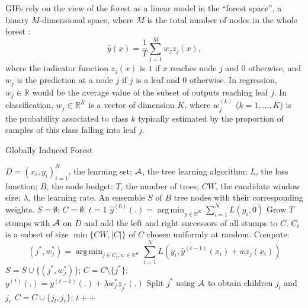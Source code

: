 \documentclass{article}
\DeclareMathOperator*{\argmin}{arg\,min}
\begin{document}
GIFs rely on the view of the forest as a linear model in the ``forest space'', 
a binary $M$-dimensional space, where $M$ is the total number of nodes in the 
whole forest \cite{l1basedcomp,vens2011random}:
%
\begin{equation}\label{eq:fs}
\hat{y}(x) =  \frac{1}{T} \sum_{j=1}^{M} w_j z_j(x),
\end{equation}
where the indicator function $z_j(x)$ is $1$ if $x$ reaches node $j$ and $0$
otherwise, and $w_j$ is the prediction at a node $j$ if $j$ is a leaf and $0$
otherwise. In regression, $w_j \in \mathbb{R}$ would be the average value of
the subset of outputs reaching leaf $j$. In classification, $w_j \in
\mathbb{R}^K$ is a vector of dimension $K$, where $w_j^{(k)}$ ($k=1,\ldots,K$)
is the probability associated to class $k$ typically estimated by the
proportion of samples of this class falling into leaf $j$.

\begin{algorithm}[tb]
   \caption{Globally Induced Forest}
   \label{alg:gif}
\begin{algorithmic}[1]
     $D= (x_i,y_i)_{i=1}^N$, the learning set; ${\cal 
    A}$, the tree learning algorithm; $L$, the loss function;  $B$, the node 
    budget; $T$, the number of trees; $CW$, the candidate window size; 
    $\lambda$, the learning rate.
     An ensemble $S$ of $B$ tree nodes with their 
    corresponding weights.
    \STATE $S=\emptyset$; $C=\emptyset$; $t=1$
    \STATE $\hat{y}^{(0)}(.)= \argmin_{y \in \mathbb{R}^K} \sum_{i=1}^{N} 
    L(y_i, 0)$
    \STATE Grow $T$ stumps with ${\cal A}$ on $D$ and add the left and right 
    successors of all stumps to  $C$.    
    \REPEAT
        \STATE $C_t$ is a subset of size $\min\{CW, |C|\}$ of $C$ chosen 
        uniformly at random.
        \STATE Compute:
            \vspace{-1.5em}
            \begin{equation*}
            (j^*,w^*_j)=\argmin_{j\in C_t, w\in \mathbb{R}^K} 
            \sum_{i=1}^{N} L \left(y_i, \hat{y}^{(t-1)}(x_i) + w z_j(x_i) 
            \right)
            \end{equation*}
            \vspace{-1em}
        \STATE $S=S\cup\{(j^*,w^*_j)\}$; $C=C\setminus\{j^*\}$; \\
            $y^{(t)}(.)=y^{(t-1)}(.)+\lambda w^*_j z_{j^*}(.)$
        \STATE Split $j^*$ using ${\cal A}$ to obtain children $j_l$ and $j_r$
        \STATE $C=C\cup\{j_l,j_r\}$; $t++$
\end{algorithmic}
\end{algorithm}
\end{document}
